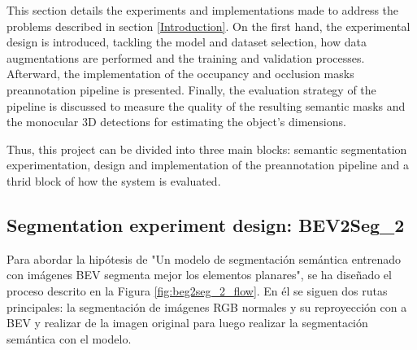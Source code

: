 

This section details the experiments and implementations made to address the problems described in section \ref{Introduction}. On the first hand, the experimental design is introduced, tackling the model and dataset selection, how data augmentations are performed and the training and validation processes. Afterward, the implementation of the occupancy and occlusion masks preannotation pipeline is presented. Finally, the evaluation strategy of the pipeline is discussed to measure the quality of the resulting semantic masks and the monocular 3D detections for estimating the object's dimensions.


Thus, this project can be divided into three main blocks:  semantic segmentation experimentation, design and implementation of the preannotation pipeline and a thrid block of how the system is evaluated.

\subsection{Segmentation experiment design: BEV2Seg\_2}
\label{bev2seg_2}

Para abordar la hipótesis de "Un modelo de segmentación semántica entrenado con imágenes BEV segmenta mejor los elementos planares", se ha diseñado el proceso descrito en la Figura \ref{fig:beg2seg_2_flow}. En él se siguen dos rutas principales: la segmentación de imágenes RGB normales y su reproyección con  a BEV y realizar  de la imagen original para luego realizar la segmentación semántica con el modelo.

